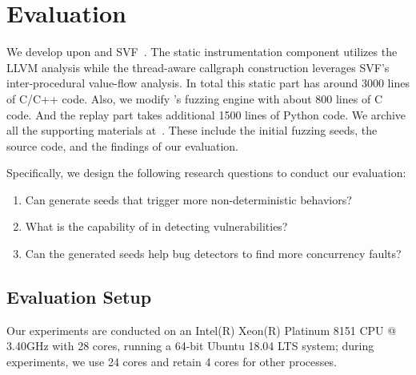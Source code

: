 \vspace{11pt}

 
\section{Evaluation}

We develop \mtfuzz upon \FOT and SVF~\cite{Sui:2016:SVF,DBLP:conf/ppopp/DiS16,DBLP:conf/cgo/SuiDX16}. 
The static instrumentation component utilizes the LLVM analysis while the 
thread-aware callgraph construction leverages SVF's inter-procedural value-flow 
analysis. In total this static part has around 3000 lines of C/C++ code. Also, 
we modify \FOT's fuzzing engine with about 800 lines of C code. And the replay part 
takes additional 1500 lines of Python code. We archive all the supporting materials 
at~\cite{mtfuzz-webpage}. These include the initial 
fuzzing seeds, the source code, and the findings of our evaluation.

Specifically, we design the following research questions to conduct our evaluation:
\begin{enumerate}[{\bf RQ1}]
    \item Can \mtfuzz generate seeds that trigger more non-deterministic behaviors?
    \item What is the capability of \mtfuzz in detecting vulnerabilities?
    \item Can the generated seeds help bug detectors to find more 
			concurrency faults?
\end{enumerate}

\subsection{Evaluation Setup}
Our experiments are conducted on an Intel(R) Xeon(R) Platinum
8151 CPU @ 3.40GHz with 28 cores, running a 64-bit Ubuntu 18.04
LTS system; during experiments, we use 24 cores and retain 4 cores
for other processes.

